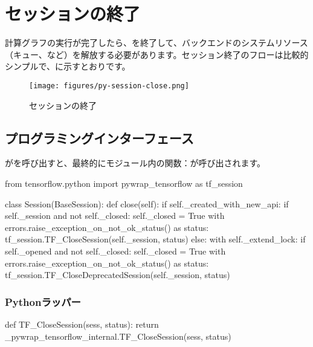 \section{セッションの終了}

\begin{content}

計算グラフの実行が完了したら、を終了して、バックエンドのシステムリソース（キュー、など）を解放する必要があります。セッション終了のフローは比較的シンプルで、に示すとおりです。

\begin{figure}[H]
\centering
\texttt{[image: figures/py-session-close.png]}
\caption{セッションの終了}
 \label{fig:py-session-close}
\end{figure}

\subsection{プログラミングインターフェース}

がを呼び出すと、最終的にモジュール内の関数：が呼び出されます。

\begin{leftbar}
\begin{python}[caption={tensorflow/python/client/session.py}]
from tensorflow.python import pywrap_tensorflow as tf_session

class Session(BaseSession):
  def close(self):
    if self._created_with_new_api:
      if self._session and not self._closed:
        self._closed = True
        with errors.raise_exception_on_not_ok_status() as status:
          tf_session.TF_CloseSession(self._session, status)
    else:
      with self._extend_lock:
        if self._opened and not self._closed:
          self._closed = True
          with errors.raise_exception_on_not_ok_status() as status:
            tf_session.TF_CloseDeprecatedSession(self._session, status)
\end{python}
\end{leftbar}

\subsubsection{Pythonラッパー}

\begin{leftbar}
\begin{python}[caption={tensorflow/bazel-bin/tensorflow/python/pywrap\_tensorflow\_internal.py}]
def TF_CloseSession(sess, status):
    return _pywrap_tensorflow_internal.TF_CloseSession(sess, status)


\end{python}
\end{leftbar}
\end{content}

